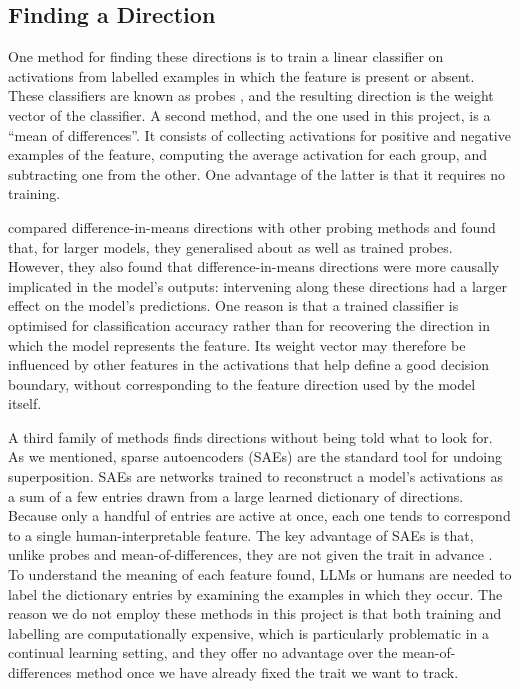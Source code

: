 \subsection{Finding a Direction}
\label{subsec:finding_directions}
One method for finding these directions is to train a linear classifier on activations from labelled examples in which the feature is present or absent. These classifiers are known as probes \citep{alain2016probes}, and the resulting direction is the weight vector of the classifier. A second method, and the one used in this project, is a ``mean of differences''. It consists of collecting activations for positive and negative examples of the feature, computing the average activation for each group, and subtracting one from the other. One advantage of the latter is that it requires no training.

\citet{marks2024geometry_truth} compared difference-in-means directions with other probing methods and found that, for larger models, they generalised about as well as trained probes. However, they also found that difference-in-means directions were more causally implicated in the model's outputs: intervening along these directions had a larger effect on the model's predictions. One reason is that a trained classifier is optimised for classification accuracy rather than for recovering the direction in which the model represents the feature. Its weight vector may therefore be influenced by other features in the activations that help define a good decision boundary, without corresponding to the feature direction used by the model itself.

A third family of methods finds directions without being told what to look for. As we mentioned, sparse autoencoders (SAEs) are the standard tool for undoing superposition. SAEs are networks trained to reconstruct a model's activations as a sum of a few entries drawn from a large learned dictionary of directions. Because only a handful of entries are active at once, each one tends to correspond to a single human-interpretable feature. The key advantage of SAEs is that, unlike probes and mean-of-differences, they are not given the trait in advance \citep{kantamneni2025are_saes_useful}. To understand the meaning of each feature found, LLMs or humans are needed to label the dictionary entries by examining the examples in which they occur. The reason we do not employ these methods in this project is that both training and labelling are computationally expensive, which is particularly problematic in a continual learning setting, and they offer no advantage over the mean-of-differences method once we have already fixed the trait we want to track.


